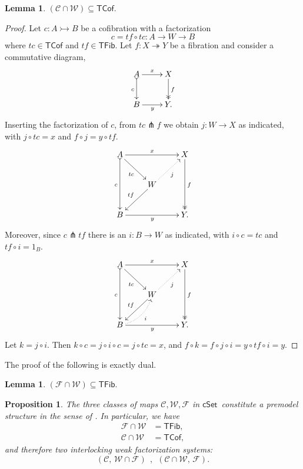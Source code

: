 \documentclass[11pt,reqno]{amsart}
\newcommand{\cSet}{\ensuremath{\mathsf{cSet}}}
\newcommand{\mono}{\ensuremath{\rightarrowtail}}
\newcommand{\ra}{\ensuremath{\rightarrow}}
\newcommand{\onto}{\ensuremath{\twoheadrightarrow}}
\newtheorem{proposition}[theorem]{Proposition}
\newtheorem{lemma}[theorem]{Lemma}
\theoremstyle{remark}
\theoremstyle{definition}
\begin{document}
\begin{lemma}
$(\mathcal{C} \cap \mathcal{W})  \subseteq \mathsf{TCof}.$
\end{lemma}
\begin{proof}
Let $c : A\mono B$ be a cofibration with a factorization 
\[
c = tf\circ tc : A \ra W\ra B
\]
where $tc\in\mathsf{TCof}$ and $tf\in\mathsf{TFib}$.  Let $f:X\onto Y$ be a fibration and consider a commutative diagram,
\begin{equation*}%
\xymatrix{
A \ar@{>->}[d]_{c} \ar[r]^-{x}  & X \ar@{>>}[d]^{f} \\
B \ar[r]_{y} &  Y.
}
\end{equation*}
Inserting the factorization of $c$, from $tc \pitchfork f$ we obtain $j : W\ra X$ as indicated, with $j\circ tc = x$ and $f\circ j = y\circ tf$.
\begin{equation*}%
\xymatrix{
A \ar@{>->}[dd]_{c} \ar[rd]_{tc} \ar[rr]^-{x}  && X \ar@{>>}[dd]^{f} \\
& W \ar[ld]_{tf} \ar@{.>}[ru]_{j} & \\
B \ar[rr]_{y} &&  Y.
}
\end{equation*}
Moreover, since $c\pitchfork tf$ there is an $i : B \ra W$ as indicated, with $i\circ c = tc$ and $tf\circ i = 1_B$.
\begin{equation*}%
\xymatrix{
A \ar@{>->}[dd]_{c} \ar[rd]_{tc} \ar[rr]^-{x}  && X \ar@{>>}[dd]^{f} \\
& W \ar[ld]_{tf} \ar@{.>}[ru]_{j} & \\
B \ar[rr]_{y} \ar@{.>}@/_2ex/[ru]_--{i} &&  Y.
}
\end{equation*}
Let $k = j\circ i$. Then $k \circ c = j\circ i \circ c = j \circ tc = x$, and $f \circ k = f\circ j\circ i = y\circ tf\circ i = y$.
\end{proof}

The proof of the following is exactly dual.
\begin{lemma}
$(\mathcal{F} \cap \mathcal{W})  \subseteq \mathsf{TFib}.$
\end{lemma}

\begin{proposition}\label{prop:FWC}
The three classes of maps $\mathcal{C}, \mathcal{W}, \mathcal{F}$ in \cSet\ constitute a \emph{premodel structure} in the sense of \cite{Barton}.   In particular,  we have 
\begin{align*}
\mathcal{F}\cap\mathcal{W} &= \mathsf{TFib}, \\
\mathcal{C}\cap\mathcal{W} &= \mathsf{TCof},
\end{align*}
and therefore two interlocking weak factorization systems:
\[
(\mathcal{C},\, \mathcal{W}\cap\mathcal{F})\ \ ,\ \ (\mathcal{C}\cap\mathcal{W},\, \mathcal{F}).
\]
\end{proposition}
\end{document}
